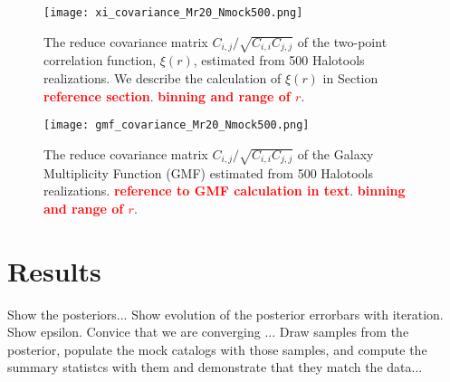 \documentclass[12pt, preprint]{aastex}
\newcommand{\todo}[1]{{\bf \textcolor{red}{ #1}}}
\begin{document}
\begin{figure}
\texttt{[image: xi\_covariance\_Mr20\_Nmock500.png]}
\caption{The reduce covariance matrix $C_{i,j}/\sqrt{C_{i,i} C_{j,j}}$ of 
the two-point correlation function, $\xi(r)$, estimated from 500 Halotools 
realizations. We describe the calculation of $\xi(r)$ in Section \todo{reference section}. \todo{binning and range of $r$}.}
\label{fig:2pcf_cov}
\end{figure}
\begin{figure}
  \texttt{[image: gmf\_covariance\_Mr20\_Nmock500.png]}
\caption{The reduce covariance matrix $C_{i,j}/\sqrt{C_{i,i} C_{j,j}}$ of 
the Galaxy Multiplicity Function (GMF) estimated from 500 Halotools 
realizations. \todo{reference to GMF calculation in text}. 
\todo{binning and range of $r$}.}
\label{fig:gmf_cov}
\end{figure}

\section{Results}\label{sec:results}
Show the posteriors...
Show evolution of the posterior errorbars with iteration. Show epsilon. Convice that we are converging ...
Draw samples from the posterior, populate the mock catalogs with those samples, and compute the summary statistcs with them 
and demonstrate that they match the data...
\end{document}
